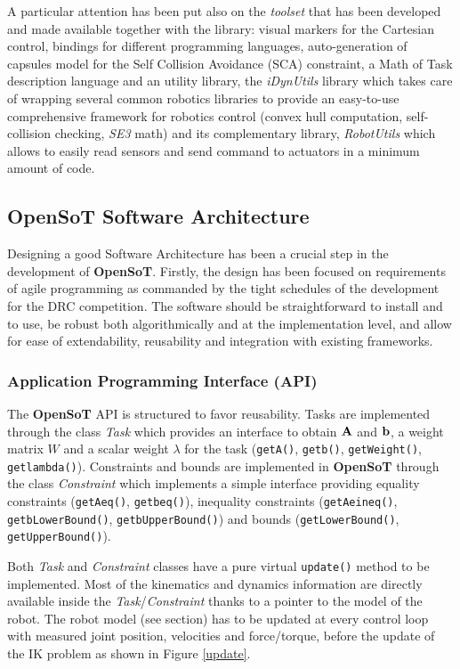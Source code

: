 A particular attention has been put also on the \emph{toolset} that has been developed and made available together with the library: visual markers for the Cartesian control, bindings for different programming languages, auto-generation of capsules model for the Self Collision Avoidance (SCA) constraint, a Math of Task description language and an utility library, the \emph{iDynUtils} library which takes care of wrapping several common robotics libraries to provide an easy-to-use comprehensive framework for robotics control (convex hull computation, self-collision checking, \emph{SE3} math) and its complementary library, \emph{RobotUtils} which allows to easily read sensors and send command to actuators in a minimum amount of code. 

\subsection{OpenSoT Software Architecture}
\label{sec:software_architecture}
Designing a good Software Architecture has been a crucial step in the development of \textbf{OpenSoT}. Firstly, the design has been focused on requirements of agile programming as commanded by the tight schedules of the development for the DRC competition. The software should be straightforward to install and to use, be robust both algorithmically and at the implementation level, and allow for ease of extendability, reusability and integration with existing frameworks.

\subsubsection{Application Programming Interface (API)}
The \textbf{OpenSoT} API is structured to favor reusability.
Tasks are implemented through the class \emph{Task} which provides an interface to obtain $\mathbf{A}$ and $\mathbf{b}$, a weight matrix $W$ and a scalar weight $\lambda$ for the task (\texttt{\small getA()}, \texttt{\small getb()}, \texttt{\small getWeight()}, \texttt{\small getlambda()}).
Constraints and bounds are implemented in \textbf{OpenSoT} through the class \emph{Constraint} which implements a simple interface providing equality constraints (\texttt{\small getAeq()}, \texttt{\small getbeq()}), inequality constraints (\texttt{\small getAeineq()}, \texttt{\small getbLowerBound()}, \texttt{\small getbUpperBound()}) and bounds (\texttt{\small getLowerBound()}, \texttt{\small getUpperBound()}).

Both \emph{Task} and \emph{Constraint} classes have a pure virtual \texttt{\small update()} method to be implemented. Most of the kinematics and dynamics information are directly available inside the \emph{Task}/\emph{Constraint} thanks to a pointer to the model of the robot. The robot model (see  section) has to be updated at every control loop with measured joint position, velocities and force/torque, before the update of the IK problem as shown in Figure \ref{update}.

